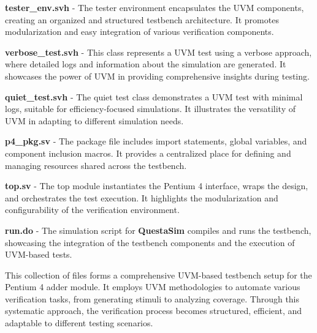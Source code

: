 \documentclass[12pt,a4paper]{report}
\begin{document}
\vspace*{0.3cm}

\textbf{tester\_env.svh} - The tester environment encapsulates the UVM components, creating an organized and structured testbench architecture. It promotes modularization and easy integration of various verification components.

\vspace*{0.3cm}

\textbf{verbose\_test.svh} - This class represents a UVM test using a verbose approach, where detailed logs and information about the simulation are generated. It showcases the power of UVM in providing comprehensive insights during testing.

\vspace*{0.3cm}

\textbf{quiet\_test.svh} - The quiet test class demonstrates a UVM test with minimal logs, suitable for efficiency-focused simulations. It illustrates the versatility of UVM in adapting to different simulation needs.

\vspace*{0.3cm}

\textbf{p4\_pkg.sv} - The package file includes import statements, global variables, and component inclusion macros. It provides a centralized place for defining and managing resources 
shared across the testbench.

\vspace*{0.3cm}

\textbf{top.sv} - The top module instantiates the Pentium 4 interface, wraps the design, and orchestrates the test execution. It highlights the modularization and configurability of the verification environment.

\vspace*{0.3cm}

\textbf{run.do} - The simulation script for \textbf{QuestaSim} compiles and runs the testbench, showcasing the integration of the testbench components and the execution of UVM-based tests.

\vspace*{0.3cm}

This collection of files forms a comprehensive UVM-based testbench setup for the Pentium 4 adder module. It employs UVM methodologies to automate various verification tasks, from generating stimuli to analyzing coverage. Through this systematic approach, the verification process becomes structured, efficient, and adaptable to different testing scenarios.
\end{document}
